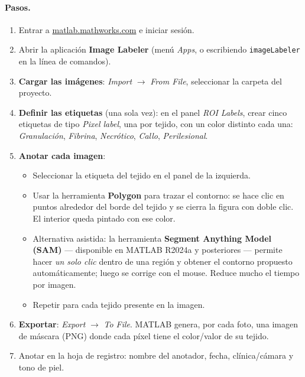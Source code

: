 \documentclass[12pt,letterpaper]{article}
\begin{document}
\paragraph{Pasos.}
\begin{enumerate}
  \item Entrar a \href{https://matlab.mathworks.com}{matlab.mathworks.com} e iniciar sesión.
  \item Abrir la aplicación \textbf{Image Labeler} (menú \textit{Apps}, o escribiendo
        \texttt{imageLabeler} en la línea de comandos).
  \item \textbf{Cargar las imágenes}: \textit{Import} $\rightarrow$ \textit{From File}, seleccionar
        la carpeta del proyecto.
  \item \textbf{Definir las etiquetas} (una sola vez): en el panel \textit{ROI Labels}, crear cinco
        etiquetas de tipo \textit{Pixel label}, una por tejido, con un color distinto cada una:
        \textit{Granulación}, \textit{Fibrina}, \textit{Necrótico}, \textit{Callo},
        \textit{Perilesional}.
  \item \textbf{Anotar cada imagen}:
    \begin{itemize}
      \item Seleccionar la etiqueta del tejido en el panel de la izquierda.
      \item Usar la herramienta \textbf{Polygon} para trazar el contorno: se hace clic en puntos
            alrededor del borde del tejido y se cierra la figura con doble clic. El interior queda
            pintado con ese color.
      \item Alternativa asistida: la herramienta \textbf{Segment Anything Model (SAM)} ---
            disponible en MATLAB R2024a y posteriores --- permite hacer \emph{un solo clic} dentro de
            una región y obtener el contorno propuesto automáticamente; luego se corrige con el mouse.
            Reduce mucho el tiempo por imagen.
      \item Repetir para cada tejido presente en la imagen.
    \end{itemize}
  \item \textbf{Exportar}: \textit{Export} $\rightarrow$ \textit{To File}. MATLAB genera, por cada
        foto, una imagen de máscara (PNG) donde cada píxel tiene el color/valor de su tejido.
  \item Anotar en la hoja de registro: nombre del anotador, fecha, clínica/cámara y tono de piel.
\end{enumerate}
\end{document}
